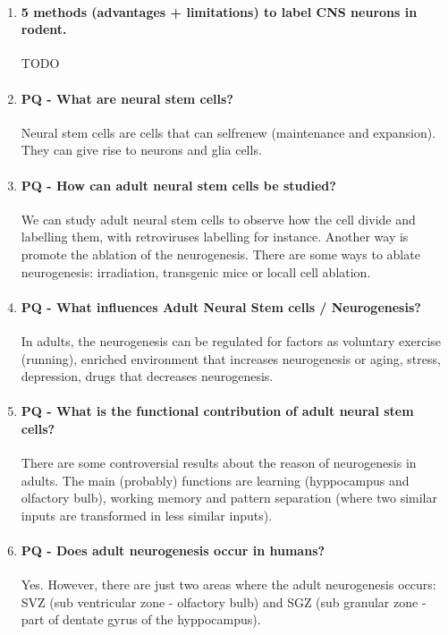 \documentclass[12pt,article,oneside,a4paper]{memoir}
\begin{document}
\begin{enumerate}
\item \paragraph{5 methods (advantages + limitations) to label CNS neurons in rodent.}
TODO

\item \paragraph{PQ - What are neural stem cells?}
Neural stem cells are cells that can self­renew (maintenance and expansion). They can give rise to neurons and glia cells.

\item \paragraph{PQ - How can adult neural stem cells be studied?} We can study adult neural stem cells to observe how the cell divide and labelling them, with retroviruses labelling for instance. Another way is promote the ablation of the neurogenesis. There are some ways to ablate neurogenesis: irradiation, transgenic mice or locall cell ablation.

\item \paragraph{PQ - What influences Adult Neural Stem cells / Neurogenesis?}
In adults, the neurogenesis can be regulated for factors as voluntary exercise (running), enriched environment that increases neurogenesis or aging, stress, depression, drugs that decreases neurogenesis.

\item \paragraph{PQ - What is the functional contribution of adult neural stem cells?}
There are some controversial results about the reason of neurogenesis in adults. The main (probably) functions are learning (hyppocampus and olfactory bulb), working memory and pattern separation (where two similar inputs are transformed in less similar inputs).

\item \paragraph{PQ - Does adult neurogenesis occur in humans?}
Yes. However, there are just two areas where the adult neurogenesis occurs: SVZ (sub ventricular zone - olfactory bulb) and SGZ (sub granular zone - part of dentate gyrus of the hyppocampus).


\end{enumerate}
\end{document}
